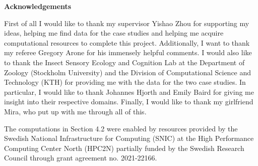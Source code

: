 \newenvironment{acknowledgements}%
    {\cleardoublepage\thispagestyle{empty}\null\vfill\begin{center}%
    \bfseries Acknowledgements\end{center}}%
    {\vfill\null}
        \begin{acknowledgements}
          First of all I would like to thank my supervisor Yishao Zhou for supporting my ideas, helping me find data for the case studies and helping me acquire computational resources to complete this project. Additionally, I want to thank my referee Gregory Arone for his immensely helpful comments. I would also like to thank the Insect Sensory Ecology and Cognition Lab at the Department of Zoology (Stockholm University) and the Division of Computational Science and Technology (KTH) for providing me with the data for the two case studies. In particular, I would like to thank Johannes Hjorth and Emily Baird for giving me insight into their respective domains. Finally, I would like to thank my girlfriend Mira, who put up with me through all of this.

          The computations in Section 4.2 were enabled by resources provided by the Swedish National Infrastructure for Computing (SNIC) at the High Performance Computing Center North (HPC2N) partially funded by the Swedish Research Council through grant agreement no. 2021-22166.
        \end{acknowledgements}
